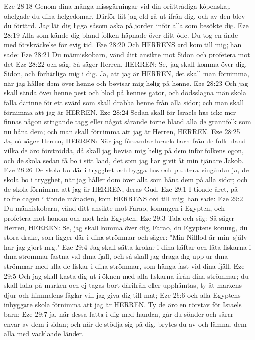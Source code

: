 Eze 28:18  Genom dina många missgärningar vid din orättrådiga köpenskap ohelgade du dina helgedomar. Därför lät jag eld gå ut ifrån dig, och av den blev du förtärd. Jag lät dig ligga såsom aska på jorden inför alla som besökte dig.
Eze 28:19  Alla som kände dig bland folken häpnade över ditt öde. Du tog en ände med förskräckelse för evig tid.
Eze 28:20  Och HERRENS ord kom till mig; han sade:
Eze 28:21  Du människobarn, vänd ditt ansikte mot Sidon och profetera mot det
Eze 28:22  och säg: Så säger Herren, HERREN: Se, jag skall komma över dig, Sidon, och förhärliga mig i dig. Ja, att jag är HERREN, det skall man förnimma, när jag håller dom över henne och bevisar mig helig på henne.
Eze 28:23  Och jag skall sända över henne pest och blod på hennes gator, och dödsslagna män skola falla därinne för ett svärd som skall drabba henne från alla sidor; och man skall förnimma att jag är HERREN.
Eze 28:24  Sedan skall för Israels hus icke mer finnas någon stingande tagg eller något sårande törne bland alla de grannfolk som nu håna dem; och man skall förnimma att jag är Herren, HERREN.
Eze 28:25  Ja, så säger Herren, HERREN: När jag församlar Israels barn från de folk bland vilka de äro förströdda, då skall jag bevisa mig helig på dem inför folkens ögon, och de skola sedan få bo i sitt land, det som jag har givit åt min tjänare Jakob.
Eze 28:26  De skola bo där i trygghet och bygga hus och plantera vingårdar ja, de skola bo i trygghet, när jag håller dom över alla som håna dem på alla sidor; och de skola förnimma att jag är HERREN, deras Gud.
Eze 29:1  I tionde året, på tolfte dagen i tionde månaden, kom HERRENS ord till mig; han sade:
Eze 29:2  Du människobarn, vänd ditt ansikte mot Farao, konungen i Egypten, och profetera mot honom och mot hela Egypten.
Eze 29:3  Tala och säg: Så säger Herren, HERREN: Se, jag skall komma över dig, Farao, du Egyptens konung, du stora drake, som ligger där i dina strömmar och säger: "Min Nilflod är min; själv har jag gjort mig."
Eze 29:4  Jag skall sätta krokar i dina käftar och låta fiskarna i dina strömmar fastna vid dina fjäll, och så skall jag draga dig upp ur dina strömmar med alla de fiskar i dina strömmar, som hänga fast vid dina fjäll.
Eze 29:5  Och jag skall kasta dig ut i öknen med alla fiskarna ifrån dina strömmar; du skall falla på marken och ej tagas bort därifrån eller upphämtas, ty åt markens djur och himmelens fåglar vill jag giva dig till mat;
Eze 29:6  och alla Egyptens inbyggare skola förnimma att jag är HERREN. Ty de äro en rörstav för Israels barn;
Eze 29:7  ja, när dessa fatta i dig med handen, går du sönder och sårar envar av dem i sidan; och när de stödja sig på dig, brytes du av och lämnar dem alla med vacklande länder.

